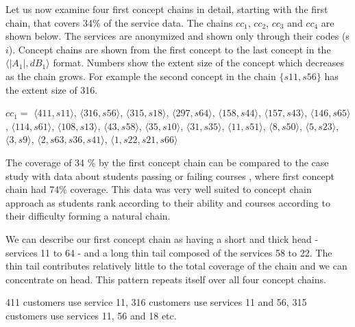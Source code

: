 \documentclass[acmconf,authordraft]{acmart}
\begin{document}
Let us now examine four first concept chains in detail, starting with the first chain, that covers 34\% of the service data. The chains $cc_1$, $cc_2$, $cc_3$ and $cc_4$ are shown below. The services are anonymized and shown only through their codes (s$i$). Concept chains are shown from the first concept to the last concept in the $\langle|A_1|, dB_1 \rangle$ format. Numbers show the extent size of the concept which decreases as the chain grows.  For example the second concept in the chain $\{s11, s56\}$ has the extent size of 316.

$cc_1 = $
$\langle 411, {s11} \rangle$,
$\langle 316, {s56} \rangle$,
$\langle 315, {s18} \rangle$,
$\langle 297, {s64} \rangle$,
$\langle 158, {s44} \rangle$,
$\langle 157, {s43} \rangle$,
$\langle 146, {s65} \rangle$,
$\langle 114, {s61} \rangle$,
$\langle 108, {s13} \rangle$,
$\langle 43, {s58} \rangle$,
$\langle 35, {s10} \rangle$,
$\langle 31, {s35} \rangle$,
$\langle 11, {s51} \rangle$,
$\langle 8, {s50} \rangle$,
$\langle 5, {s23} \rangle$,
$\langle 3, {s9} \rangle$,
$\langle 2, {s63, s36, s41} \rangle$,
$\langle 1, {s22, s21, s66} \rangle$



The coverage of 34 \% by the first concept chain can be compared to the case study with data about students passing or failing  courses \cite{torim_covering_2019}, where first concept chain had   74\% coverage. This data was very well suited to concept chain approach as students rank according to their ability and courses according to their difficulty forming a natural chain.

We can describe our first concept chain as having a short and thick head - services 11 to 64 - and a long thin tail composed of the services 58 to 22. The thin tail contributes relatively little to the total coverage of the chain and we can concentrate on  head. This pattern repeats itself over all four concept chains.

411 customers use service 11, 316 customers use services 11 and 56, 315 customers use services 11, 56 and 18 etc.
\end{document}
